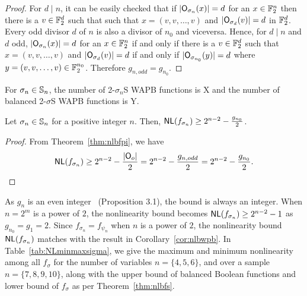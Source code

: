 \documentclass{llncs}
\begin{document}
\begin{proof}
For $d \mid n$, it can be easily checked that if $|\mathsf{O}_{\sigma_n}(x)| = d$ for an $x \in \mathbb{F}_2^n$ then there is a $v \in \mathbb{F}_2^d$ such that such that $x = (v,v, \ldots, v)$ and $|\mathsf{O}_{\sigma_d}(v)| = d$ in $\mathbb{F}_2^d$.
Every odd divisor $d$ of $n$ is also a divisor of $n_0$ and viceversa. 
Hence, for $d\mid n$ and $d$ odd, $|\mathsf{O}_{\sigma_n}(x)| = d$ for an $x\in \mathbb{F}_2^n$ if and only if there is a $v \in \mathbb{F}_2^d$ such that $x = (v,v, \ldots, v)$ and $|\mathsf{O}_{\sigma_d}(v)| = d$ if and only if $|\mathsf{O}_{\sigma_{n_0}}(y)| = d$ where $y = (v,v, \ldots, v) \in \mathbb{F}_2^{n_0}$. Therefore $g_{n,odd} = g_{n_0}$.
\end{proof}
\begin{corollary}\label{cor:countsigma}
For $\sigma_n \in \mathbb{S}_n$, the number of 2-$\sigma_n$S  WAPB functions is X and the number of balanced 2-$\sigma$S  WAPB functions is Y.
\end{corollary}



\begin{theorem}\label{thm:nlbfs}
Let $\sigma_n \in \mathbb{S}_n$ for a positive integer $n$.
Then, $\mathsf{NL}(f_{\sigma_n}) \ge 2^{n-2} - \frac{g_{n_0}}{2}$.
\end{theorem}
\begin{proof}
From Theorem~\ref{thm:nlbfpi}, we have
$$\mathsf{NL}(f_{\sigma_n}) \ge 2^{n-2} - \frac{|\mathsf{O}_o|}{2} = 2^{n-2} - \frac{g_{n,odd}}{2} = 2^{n-2} - \frac{g_{n_0}}{2}.$$
\end{proof}
As $g_n$ is an even integer~\cite{DM:CI18} (Proposition 3.1), the bound is always an integer. 
When $n = 2^m$ is a power of $2$, the nonlinearity bound becomes $\mathsf{NL}(f_{\sigma_n}) \ge 2^{n-2} - 1$ as $g_{n_0} = g_1 = 2$. 
Since $f_{\sigma_n} = f_{\psi_n}$ when $n$ is a power of $2$, the nonlinearity bound $\mathsf{NL}(f_{\sigma_n})$ matches with the result in Corollary~\ref{cor:nlbwpb}. 
In Table~\ref{tab:NLminmaxsigma}, we give the maximum and minimum nonlinearity among all $f_\sigma$ for the number of variables $n = \{4, 5, 6\}$, and over a sample $n = \{7, 8, 9, 10\}$, along with the upper bound of balanced Boolean functions and lower bound of $f_{\sigma}$ as per Theorem~\ref{thm:nlbfs}.
\end{document}
